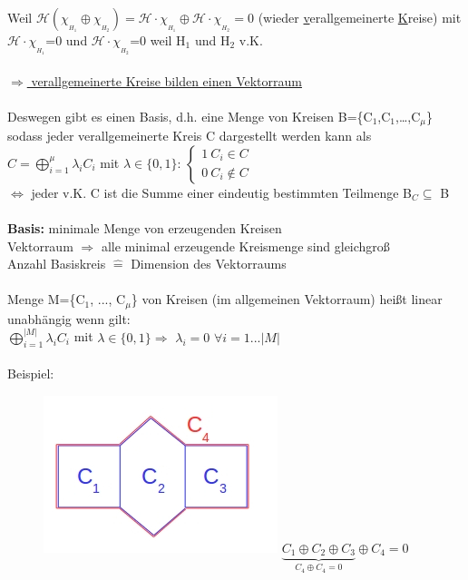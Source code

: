 Weil $\mathcal{H} (\chi_{_{H_1}} \oplus \chi_{_{H_2}}) = \mathcal{H} \cdot \chi_{_{H_1}} \oplus \mathcal{H} \cdot \chi_{_{H_2}} = 0$ (wieder \underline{v}erallgemeinerte \underline{K}reise) mit\\
$\mathcal{H} \cdot \chi_{_{H_1}}$=0 und $\mathcal{H} \cdot \chi_{_{H_2}}$=0 weil H$_1$ und H$_2$ v.K.
\\\\
\underline{$\Rightarrow$ verallgemeinerte Kreise bilden einen Vektorraum}
\\\\
Deswegen gibt es einen Basis, d.h. eine Menge von Kreisen B=\{C$_1$,C$_1$,…,C$_{\mu}$\} sodass jeder verallgemeinerte Kreis C dargestellt werden kann als\\
$C=\bigoplus\limits_{i=1}^{\mu} \lambda_i C_i$ mit $\lambda \in \{0,1\}$: $
\begin{cases}
	1\ C_i \in C\\
	0\ C_i \notin C
\end{cases}
$
\\
$\Leftrightarrow$ jeder v.K. C ist die Summe einer eindeutig bestimmten Teilmenge B$_C \subseteq$ B
\\\\
\textbf{Basis:} minimale Menge von erzeugenden Kreisen
\\
Vektorraum $\Rightarrow$ alle minimal erzeugende Kreismenge sind gleichgroß\\
Anzahl Basiskreis $\widehat{=}$ Dimension des Vektorraums
\\\\
Menge M=\{C$_1$, ..., C$_\mu$\} von Kreisen (im allgemeinen Vektorraum) heißt linear unabhängig wenn gilt:\\
$\bigoplus\limits_{i=1}^{|M|} \lambda_i C_i$ mit $\lambda \in \{0,1\}\Rightarrow$ $\lambda_i=0$ $\forall i=1 ... |M|$
\\\\
Beispiel:
\begin{figure}[htp]
\centering
\includegraphics[scale=0.75]{lectures/161104/pix/pic6.jpg}
$\underbrace{C_1 \oplus C_2 \oplus C_3}_{C_4 \oplus C_4 = 0} \oplus C_4=0$
\end{figure}

